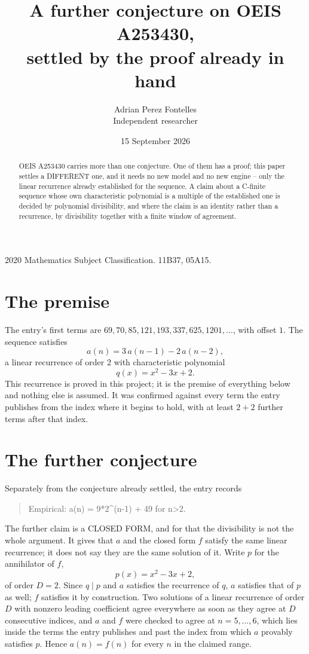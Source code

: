 \documentclass[11pt,a4paper]{article}
\title{A further conjecture on OEIS A253430,\\ \large settled by the proof already in hand}
\author{Adrian Perez Fontelles\\ \small Independent researcher}
\date{15 September 2026}
\theoremstyle{plain}
\theoremstyle{definition}
\begin{document}
\maketitle

\begin{abstract}
OEIS A253430 carries more than one conjecture. One of them has a proof; this paper settles a
DIFFERENT one, and it needs no new model and no new engine -- only the linear recurrence already
established for the sequence. A claim about a C-finite sequence whose own characteristic
polynomial is a multiple of the established one is decided by polynomial divisibility, and where
the claim is an identity rather than a recurrence, by divisibility together with a finite window
of agreement.
\end{abstract}

\noindent\small 2020 Mathematics Subject Classification. 11B37, 05A15.\normalsize

\section{The premise}

The entry's first terms are $69, 70, 85, 121, 193, 337, 625, 1201,\dots$, with offset $1$. The sequence satisfies
\[
  a(n)=3\,a(n-1) - 2\,a(n-2) ,
\]
a linear recurrence of order $2$ with characteristic polynomial
\[
  q(x)=x^{2} - 3 x + 2 .
\]
This recurrence is proved in this project; it is the premise of everything below and nothing else is assumed.
It was confirmed against every term the entry publishes from the index where it begins to hold,
with at least $2+2$ further terms after that index.

\section{The further conjecture}

Separately from the conjecture already settled, the entry records

\begin{quote}\raggedright Empirical: a(n) = 9*2\^{}(n-1) + 49 for n>2.\end{quote}

The further claim is a CLOSED FORM, and for that the divisibility is not the whole argument. It
gives that $a$ and the closed form $f$ satisfy the same linear recurrence; it does not say they
are the same solution of it. Write $p$ for the annihilator of $f$,
\[
  p(x)=x^{2} - 3 x + 2 ,
\]
of order $D=2$. Since $q\mid p$ and $a$ satisfies the recurrence of $q$, $a$ satisfies that of
$p$ as well; $f$ satisfies it by construction. Two solutions of a linear recurrence of order $D$
with nonzero leading coefficient agree everywhere as soon as they agree at $D$ consecutive
indices, and $a$ and $f$ were checked to agree at $n=5,\dots,6$,
which lies inside the terms the entry publishes and past the index from which $a$ provably
satisfies $p$. Hence $a(n)=f(n)$ for every $n$ in the claimed range.
\end{document}
